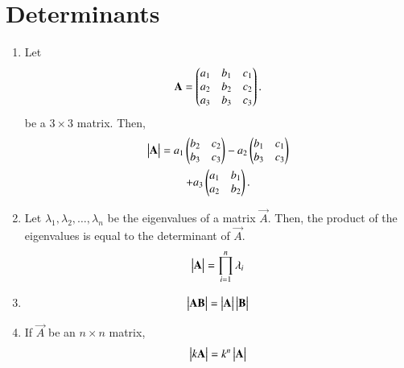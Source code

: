 \section{Determinants}
\begin{enumerate}[label=\thesection.\arabic*.,ref=\thesection.\theenumi]

\item Let 
\begin{align}
	\mathbf{A} = \begin{pmatrix}a_1 & b_1 & c_1  \\ a_2 & b_2 & c_2  \\ a_3 & b_3 & c_3\end{pmatrix}.
\end{align}
be a $3 \times 3$ matrix. 
Then, 
\begin{multline}
	\begin{vmatrix}\mathbf{A}\end{vmatrix} = a_1 \begin{pmatrix} b_2 & c_2 \\  b_3 & c_3\end{pmatrix} - a_2\begin{pmatrix} b_1 & c_1 \\  b_3 & c_3 \end{pmatrix}  \\ + a_3\begin{pmatrix}a_1 & b_1 \\ a_2 & b_2 \end{pmatrix}.
\end{multline}
\item Let $\lambda_1,\lambda_2, \dots, \lambda_n$ be the eigenvalues of a matrix $\vec{A}$.  Then,   the product of the eigenvalues is equal to the determinant of $\vec{A}$.
\begin{align}
	\begin{vmatrix}\mathbf{A}\end{vmatrix} = \prod_{i=1}^{n}\lambda_i
\end{align}
%
\item 
\begin{align}
	\begin{vmatrix}\mathbf{A}\mathbf{B}\end{vmatrix} = \begin{vmatrix}\mathbf{A}\end{vmatrix}\begin{vmatrix}\mathbf{B}\end{vmatrix}
\end{align}
\item If $\vec{A}$ be an $n \times n$ matrix, 
\begin{align}
	\label{eq:det_kord}
	\begin{vmatrix}k\mathbf{A}\end{vmatrix} = k^n\begin{vmatrix}\mathbf{A}\end{vmatrix}
\end{align}

\end{enumerate}
